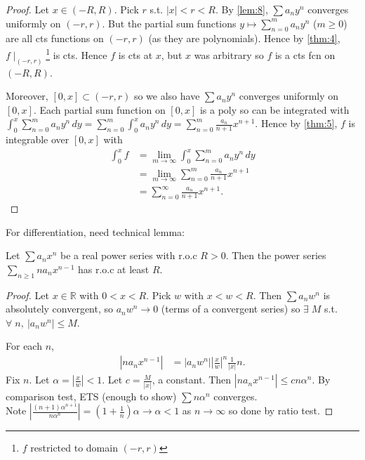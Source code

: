     \begin{proof}
        Let $x \in (-R, R)$.
        Pick $r$ s.t. $|x| < r < R$.
        By \cref{lem:8}, $\sum a_n y^n$ converges uniformly on $(-r, r)$.
        But the partial sum functions $y \mapsto \sum_{n=0}^{m} a_n y^n$ ($m \geq 0$) are all cts functions on $(-r, r)$ (as they are polynomials).
        Hence by \cref{thm:4}, $f \mid_{(-r, r)}$\footnote{$f$ restricted to domain $(-r, r)$} is cts.
        Hence $f$ is cts at $x$, but $x$ was arbitrary so $f$ is a cts fcn on $(-R, R)$.

        Moreover, $[0, x] \subset (-r, r)$ so we also have $\sum a_n y^n$ converges uniformly on $[0, x]$.
        Each partial sum function on $[0, x]$ is a poly so can be integrated with $\int_0^x \sum_{n=0}^{m} a_n y^n \,dy = \sum_{n=0}^{m} \int_{0}^{x} a_n y^n \,dy = \sum_{n=0}^{m} \frac{a_n}{n + 1} x^{n+1}$.
        Hence by \cref{thm:5}, $f$ is integrable over $[0, x]$ with
        \begin{align*}
            \int_{0}^{x} f &= \lim_{m \to \infty} \int_{0}^{x} \sum_{n=0}^{m} a_n y^n \,dy \\
            &= \lim_{m \to \infty} \sum_{n=0}^{m} \frac{a_n}{n + 1} x^{n + 1} \\
            &= \sum_{n=0}^{\infty} \frac{a_n}{n + 1} x^{n+1}.
        \end{align*} 
    \end{proof} 

    For differentiation, need technical lemma:
    \begin{lemma} \label{lem:10}
        Let $\sum a_n x^n$ be a real power series with r.o.c $R > 0$.
        Then the power series $\sum_{n \geq 1} n a_n x^{n - 1}$ has r.o.c at least $R$.
    \end{lemma} 

    \begin{proof}
        Let $x \in \mathbb{R}$ with $0 < x < R$.
        Pick $w$ with $x < w < R$.
        Then $\sum a_n w^n$ is absolutely convergent, so $a_n w^n \to 0$ (terms of a convergent series) so $\exists \; M$ s.t. $\forall \; n,\ |a_n w^n| \leq M$.

        For each $n$, 
        \begin{align*}
            |n a_n x^{n - 1}| &= |a_n w^n| \left| \frac{x}{w} \right|^n \frac{1}{|x|} n.
        \end{align*} 
        Fix $n$.
        Let $\alpha = \left| \frac{x}{w} \right| < 1$.
        Let $c = \frac{M}{|x|}$, a constant.
        Then $|n a_n x^{n - 1}| \leq c n \alpha^n$.
        By comparison test, ETS (enough to show) $\sum n \alpha^n$ converges. \\
        Note $\left| \frac{(n + 1) \alpha^{n + 1}}{n \alpha^n} \right| = (1 + \frac{1}{n}) \alpha \to \alpha < 1$ as $n \to \infty$ so done by ratio test.
    \end{proof} 


